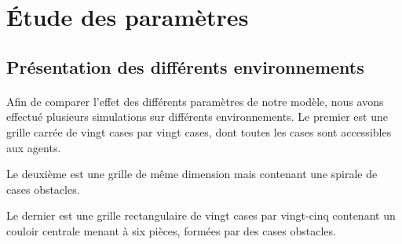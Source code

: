 \documentclass{article}
\begin{document}
\section{Étude des paramètres}
    \subsection{Présentation des différents environnements}
        \paragraph{} Afin de comparer l'effet des différents paramètres de notre modèle, nous avons effectué plusieurs simulations sur différents environnements.
        Le premier est une grille carrée de vingt cases par vingt cases, dont toutes les cases sont accessibles aux agents.

        Le deuxième est une grille de même dimension mais contenant une spirale de cases obstacles.

        Le dernier est une grille rectangulaire de vingt cases par vingt-cinq contenant un couloir centrale menant à six pièces, formées par des cases obstacles.
        
\end{document}
